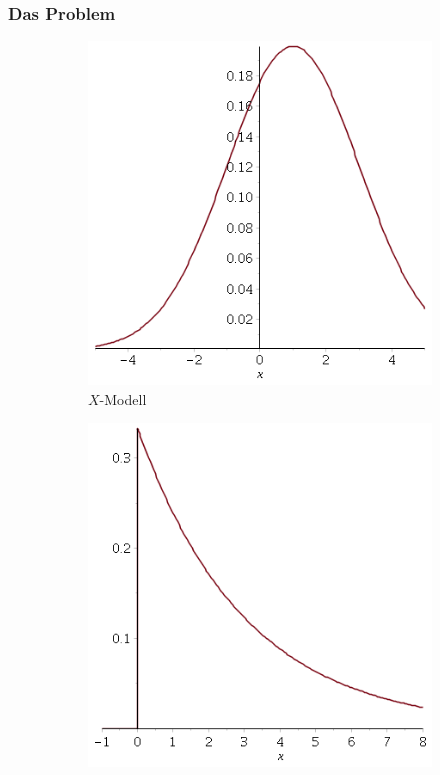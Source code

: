 \documentclass[11pt]{beamer}
\begin{document}
\begin{frame}
  \frametitle{Das Problem}
  \begin{figure}
    \centering
    \begin{subfigure}{0.3\textwidth}
      \centering
      \includegraphics[width=\textwidth]{presentation/example-x}
      \caption{$X$-Modell}
    \end{subfigure}
    \hspace{4.5em}
    \begin{subfigure}{0.3\textwidth}
      \centering
      \includegraphics[width=\textwidth]{presentation/example-y}

\end{subfigure}
\end{figure}
\end{frame}
\end{document}
